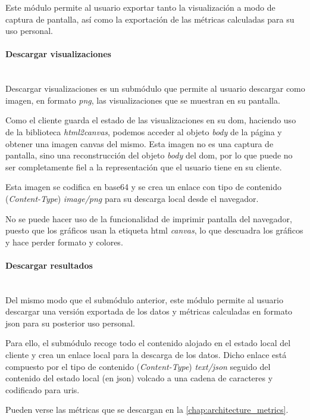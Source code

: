 Este módulo permite al usuario exportar tanto la visualización a modo de captura de pantalla, así como la exportación de las métricas calculadas para su uso personal.

\paragraph{Descargar visualizaciones}\mbox{}\\

Descargar visualizaciones es un submódulo que permite al usuario descargar como imagen, en formato \textit{png}, las visualizaciones que se muestran en su pantalla.

Como el cliente guarda el estado de las visualizaciones en su \acrshort{dom}, haciendo uso de la biblioteca \textit{html2canvas}, podemos acceder al objeto \textit{body} de la página y obtener una imagen canvas del mismo. Esta imagen no es una captura de pantalla, sino una reconstrucción del objeto \textit{body} del \acrshort{dom}, por lo que puede no ser completamente fiel a la representación que el usuario tiene en su cliente.

Esta imagen se codifica en base64 y se crea un enlace con tipo de contenido (\textit{Content-Type}) \textit{image/png}  para su descarga local desde el navegador.

No se puede hacer uso de la funcionalidad de imprimir pantalla del navegador, puesto que los gráficos usan la etiqueta \acrshort{html} \textit{canvas}, lo que descuadra los gráficos y hace perder formato y colores.

\paragraph{Descargar resultados}\mbox{}\\

Del mismo modo que el submódulo anterior, este módulo permite al usuario descargar una versión exportada de los datos y métricas calculadas en formato \acrshort{json} para su posterior uso personal.

Para ello, el submódulo recoge todo el contenido alojado en el estado local del cliente y crea un enlace local para la descarga de los datos. Dicho enlace está compuesto por el tipo de contenido (\textit{Content-Type}) \textit{text/json} seguido del contenido del estado local (en \acrshort{json}) volcado a una cadena de caracteres y codificado para \acrshort{uri}s.

Pueden verse las métricas que se descargan en la \autoref{chap:architecture_metrics}.




